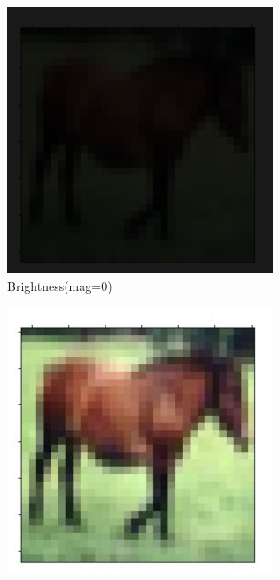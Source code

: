 \documentclass[onecolumn]{ujarticle}   %
\begin{document}
\begin{figure}[h]
      \begin{subfigure}{0.3\columnwidth}
        \centering
        \includegraphics[width=1.0\columnwidth]{transform_test/Brightness_0.png}
        \caption{Brightness(mag=0)}
        \label{fig:Brightness_0}
      \end{subfigure}
      \begin{subfigure}{0.3\columnwidth}
        \centering
        \includegraphics[width=1.0\columnwidth]{transform_test/Brightness_15.png}

\end{subfigure}
\end{figure}
\end{document}
